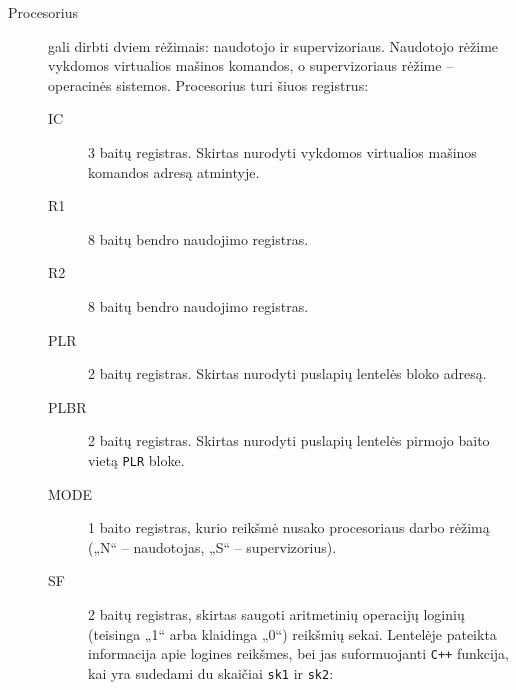 \begin{description}
  \item[Procesorius] gali dirbti dviem rėžimais: naudotojo ir 
    supervizoriaus. Naudotojo rėžime vykdomos virtualios mašinos komandos,
    o supervizoriaus rėžime – operacinės sistemos. Procesorius turi šiuos
    registrus:
    \begin{description}
      \item[IC] 3 baitų registras. Skirtas nurodyti vykdomos virtualios
        mašinos komandos adresą atmintyje.
      \item[R1] 8 baitų bendro naudojimo registras.
      \item[R2] 8 baitų bendro naudojimo registras.
      \item[PLR] 2 baitų registras. Skirtas nurodyti puslapių lentelės 
        bloko adresą.
      \item[PLBR] 2 baitų registras. Skirtas nurodyti puslapių lentelės
        pirmojo baito vietą \verb|PLR| bloke.
      \item[MODE] 1 baito registras, kurio reikšmė nusako procesoriaus
        darbo rėžimą („N“ – naudotojas, „S“ – supervizorius).
      \item[SF] 2 baitų registras, skirtas saugoti aritmetinių operacijų 
        loginių (teisinga „1“ arba klaidinga „0“) reikšmių sekai. Lentelėje
        pateikta informacija apie logines reikšmes, bei jas suformuojanti
        \verb|C++| funkcija, kai yra sudedami du skaičiai \verb|sk1| ir
        \verb|sk2|:


\end{description}
\end{description}
